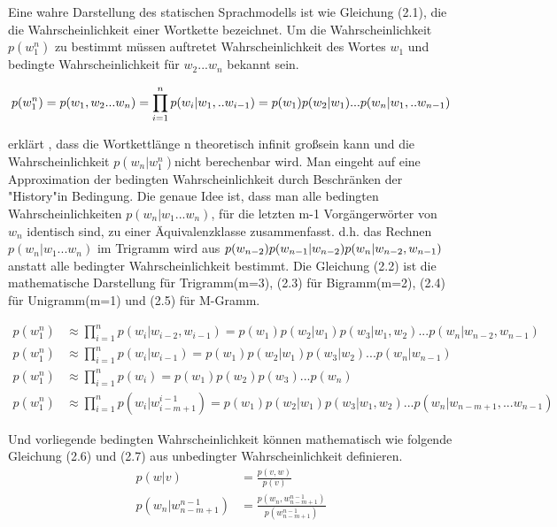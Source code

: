Eine wahre Darstellung des statischen Sprachmodells ist wie Gleichung (2.1), die die Wahrscheinlichkeit einer Wortkette bezeichnet. Um die Wahrscheinlichkeit $p(w_{1}^n)$ zu bestimmt m\"ussen auftretet Wahrscheinlichkeit des Wortes $w_{1}$ und bedingte Wahrscheinlichkeit f\"ur $w_{2}...w_{n}$ bekannt sein.

\begin{equation}
p(w_{1}^n) = p(w_{1},w_{2}...w_{n}) = \prod_{i=1}^n p(w_{i}|w_{1},..w_{i-1}) \\
= p(w_{1})p(w_{2}|w_{1})...p(w_{n}|w_{1},..w_{n-1})
\end{equation}

\cite{book_speech} erkl\"art , dass die Wortkettl\"ange n theoretisch infinit gro\ss sein kann und die Wahrscheinlichkeit $p(w_{n}|w_{1}^n)$nicht berechenbar wird. Man eingeht auf eine Approximation der bedingten Wahrscheinlichkeit durch Beschr\"anken der "History"\quad in Bedingung. Die genaue Idee ist, dass man alle bedingten Wahrscheinlichkeiten $p(w_{n}|w_{1}...w_{n})$, f\"ur die letzten m-1 Vorg\"angerw\"orter von $w_{n}$ identisch sind, zu einer \"Aquivalenzklasse zusammenfasst. d.h. das Rechnen $p(w_{n}|w_{1}...w_{n})$ im Trigramm wird aus $p(w_{n-2})p(w_{n-1}|w_{n-2})p(w_{n}|\\w_{n-2},w_{n-1})$ anstatt alle bedingter Wahrscheinlichkeit bestimmt. 
Die Gleichung (2.2) ist die mathematische Darstellung f\"ur Trigramm(m=3), (2.3) f\"ur Bigramm(m=2), (2.4) f\"ur Unigramm(m=1) und (2.5) f\"ur M-Gramm.

\begin{align}
p(w_{1}^n) & \approx \prod_{i=1}^n p(w_{i}|w_{i-2},w_{i-1})=p(w_{1})p(w_{2}|w_{1})p(w_{3}|w_{1},w_{2})...p(w_{n}|w_{n-2},w_{n-1}) \\
p(w_{1}^n) & \approx \prod_{i=1}^n p(w_{i}|w_{i-1})=p(w_{1})p(w_{2}|w_{1})p(w_{3}|w_{2})...p(w_{n}|w_{n-1}) \\
p(w_{1}^n) & \approx \prod_{i=1}^n p(w_{i})=p(w_{1})p(w_{2})p(w_{3})...p(w_{n})\\
p(w_{1}^n) & \approx \prod_{i=1}^n p(w_{i}|w_{i-m+1}^{i-1})=p(w_{1})p(w_{2}|w_{1})p(w_{3}|w_{1},w_{2})...p(w_{n}|w_{n-m+1},...w_{n-1})
\end{align}

Und vorliegende bedingten Wahrscheinlichkeit k\"onnen mathematisch wie folgende Gleichung (2.6) und (2.7)  aus unbedingter Wahrscheinlichkeit definieren.
\begin{align}
p(w|v) &=\frac{p(v,w)}{p(v)} \\
p(w_{n}|w_{n-m+1}^{n-1}) &=\frac{p(w_{n},w_{n-m+1}^{n-1} )}{p(w_{n-m+1}^{n-1})} 
\end{align}


